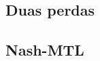 \documentclass{beamer}
\begin{document}
\subsection{Duas perdas}



\subsection{Nash-MTL}
\end{document}
